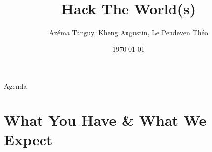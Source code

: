 \documentclass[aspectratio=169]{beamer}
\title[Hack the World(s)]{Hack The World(s)}
\author[Azéma, Kheng, Le Pendeven]{Azéma Tanguy, Kheng Augustin, Le Pendeven Théo}
\institute[]{}
\date{\today}
\begin{document}
\frame{\titlepage}

\begin{frame}{Agenda}
  \tableofcontents
\end{frame}

\section{What You Have \& What We Expect}
\end{document}
